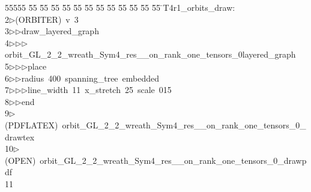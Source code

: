 %
%
\begin{tabbing}
55555 \= 55 \= 55 \= 55 \= 55 \= 55 \= 55 \= 55 \= 55 \= 55 \= 55 \= 55 \= 55 \= \>T4r1\_orbits\_draw:\\[0pt]
2\>$\triangleright$\>(ORBITER)\ v\ 3\ \\[0pt]
3\>$\triangleright$\>$\triangleright$\>draw\_layered\_graph\ \\[0pt]
4\>$\triangleright$\>$\triangleright$\>$\triangleright$\>orbit\_GL\_2\_2\_wreath\_Sym4\_res\_\_on\_rank\_one\_tensors\_0layered\_graph\ \\[0pt]
5\>$\triangleright$\>$\triangleright$\>$\triangleright$\>place\ \\[0pt]
6\>$\triangleright$\>$\triangleright$\>radius\ 400\ spanning\_tree\ embedded\ \\[0pt]
7\>$\triangleright$\>$\triangleright$\>$\triangleright$\>line\_width\ 11\ x\_stretch\ 25\ scale\ 015\ \\[0pt]
8\>$\triangleright$\>$\triangleright$\>end\\[0pt]
9\>$\triangleright$\>(PDFLATEX)\ orbit\_GL\_2\_2\_wreath\_Sym4\_res\_\_on\_rank\_one\_tensors\_0\_drawtex\\[0pt]
10\>$\triangleright$\>(OPEN)\ orbit\_GL\_2\_2\_wreath\_Sym4\_res\_\_on\_rank\_one\_tensors\_0\_drawpdf\\[0pt]
11\>\end{tabbing}
